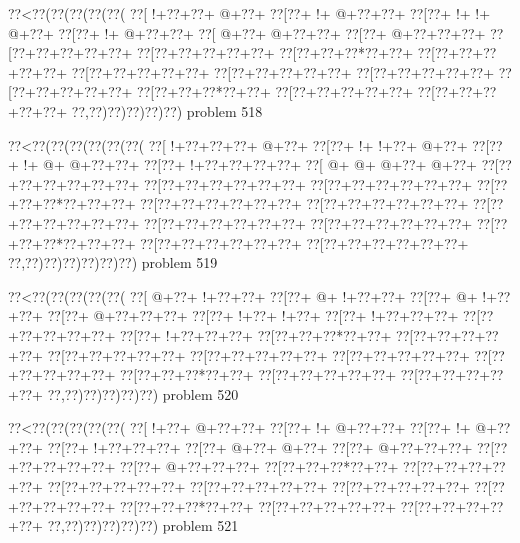 \vbox{\vbox{\goo
\0??<\0??(\0??(\0??(\0??(\0??(
\0??[\- !+\0??+\0??+\- @+\0??+
\0??[\0??+\- !+\- @+\0??+\0??+
\0??[\0??+\- !+\- !+\- @+\0??+
\0??[\0??+\- !+\- @+\0??+\0??+
\0??[\- @+\0??+\- @+\0??+\0??+
\0??[\0??+\- @+\0??+\0??+\0??+
\0??[\0??+\0??+\0??+\0??+\0??+
\0??[\0??+\0??+\0??+\0??+\0??+
\0??[\0??+\0??+\0??*\0??+\0??+
\0??[\0??+\0??+\0??+\0??+\0??+
\0??[\0??+\0??+\0??+\0??+\0??+
\0??[\0??+\0??+\0??+\0??+\0??+
\0??[\0??+\0??+\0??+\0??+\0??+
\0??[\0??+\0??+\0??+\0??+\0??+
\0??[\0??+\0??+\0??*\0??+\0??+
\0??[\0??+\0??+\0??+\0??+\0??+
\0??[\0??+\0??+\0??+\0??+\0??+
\0??,\0??)\0??)\0??)\0??)\0??)
}
\hfil problem 518\hfil\break
}

\vbox{\vbox{\goo
\0??<\0??(\0??(\0??(\0??(\0??(\0??(
\0??[\- !+\0??+\0??+\0??+\- @+\0??+
\0??[\0??+\- !+\- !+\0??+\- @+\0??+
\0??[\0??+\- !+\- @+\- @+\0??+\0??+
\0??[\0??+\- !+\0??+\0??+\0??+\0??+
\0??[\- @+\- @+\- @+\0??+\- @+\0??+
\0??[\0??+\0??+\0??+\0??+\0??+\0??+
\0??[\0??+\0??+\0??+\0??+\0??+\0??+
\0??[\0??+\0??+\0??+\0??+\0??+\0??+
\0??[\0??+\0??+\0??*\0??+\0??+\0??+
\0??[\0??+\0??+\0??+\0??+\0??+\0??+
\0??[\0??+\0??+\0??+\0??+\0??+\0??+
\0??[\0??+\0??+\0??+\0??+\0??+\0??+
\0??[\0??+\0??+\0??+\0??+\0??+\0??+
\0??[\0??+\0??+\0??+\0??+\0??+\0??+
\0??[\0??+\0??+\0??*\0??+\0??+\0??+
\0??[\0??+\0??+\0??+\0??+\0??+\0??+
\0??[\0??+\0??+\0??+\0??+\0??+\0??+
\0??,\0??)\0??)\0??)\0??)\0??)\0??)
}
\hfil problem 519\hfil\break
}

\vbox{\vbox{\goo
\0??<\0??(\0??(\0??(\0??(\0??(
\0??[\- @+\0??+\- !+\0??+\0??+
\0??[\0??+\- @+\- !+\0??+\0??+
\0??[\0??+\- @+\- !+\0??+\0??+
\0??[\0??+\- @+\0??+\0??+\0??+
\0??[\0??+\- !+\0??+\- !+\0??+
\0??[\0??+\- !+\0??+\0??+\0??+
\0??[\0??+\0??+\0??+\0??+\0??+
\0??[\0??+\- !+\0??+\0??+\0??+
\0??[\0??+\0??+\0??*\0??+\0??+
\0??[\0??+\0??+\0??+\0??+\0??+
\0??[\0??+\0??+\0??+\0??+\0??+
\0??[\0??+\0??+\0??+\0??+\0??+
\0??[\0??+\0??+\0??+\0??+\0??+
\0??[\0??+\0??+\0??+\0??+\0??+
\0??[\0??+\0??+\0??*\0??+\0??+
\0??[\0??+\0??+\0??+\0??+\0??+
\0??[\0??+\0??+\0??+\0??+\0??+
\0??,\0??)\0??)\0??)\0??)\0??)
}
\hfil problem 520\hfil\break
}

\vbox{\vbox{\goo
\0??<\0??(\0??(\0??(\0??(\0??(
\0??[\- !+\0??+\- @+\0??+\0??+
\0??[\0??+\- !+\- @+\0??+\0??+
\0??[\0??+\- !+\- @+\0??+\0??+
\0??[\0??+\- !+\0??+\0??+\0??+
\0??[\0??+\- @+\0??+\- @+\0??+
\0??[\0??+\- @+\0??+\0??+\0??+
\0??[\0??+\0??+\0??+\0??+\0??+
\0??[\0??+\- @+\0??+\0??+\0??+
\0??[\0??+\0??+\0??*\0??+\0??+
\0??[\0??+\0??+\0??+\0??+\0??+
\0??[\0??+\0??+\0??+\0??+\0??+
\0??[\0??+\0??+\0??+\0??+\0??+
\0??[\0??+\0??+\0??+\0??+\0??+
\0??[\0??+\0??+\0??+\0??+\0??+
\0??[\0??+\0??+\0??*\0??+\0??+
\0??[\0??+\0??+\0??+\0??+\0??+
\0??[\0??+\0??+\0??+\0??+\0??+
\0??,\0??)\0??)\0??)\0??)\0??)
}
\hfil problem 521\hfil\break
}

